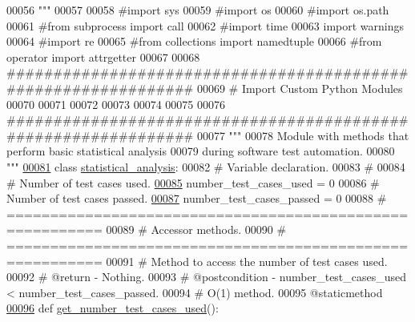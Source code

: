 \begin{DoxyCode}
00056 \textcolor{stringliteral}{"""}
00057 
00058 \textcolor{comment}{#import sys}
00059 \textcolor{comment}{#import os}
00060 \textcolor{comment}{#import os.path}
00061 \textcolor{comment}{#from subprocess import call}
00062 \textcolor{comment}{#import time}
00063 \textcolor{keyword}{import} warnings
00064 \textcolor{comment}{#import re}
00065 \textcolor{comment}{#from collections import namedtuple}
00066 \textcolor{comment}{#from operator import attrgetter}
00067 
00068 \textcolor{comment}{###############################################################}
00069 \textcolor{comment}{#   Import Custom Python Modules}
00070 
00071 
00072 
00073 
00074 
00075 
00076 \textcolor{comment}{###############################################################}
00077 \textcolor{stringliteral}{"""}
00078 \textcolor{stringliteral}{    Module with methods that perform basic statistical analysis}
00079 \textcolor{stringliteral}{        during software test automation.}
00080 \textcolor{stringliteral}{"""}
\hypertarget{test__statistics_8py_source_l00081}{}\hyperlink{classstatistics_1_1test__statistics_1_1statistical__analysis}{00081} \textcolor{keyword}{class }\hyperlink{classstatistics_1_1test__statistics_1_1statistical__analysis}{statistical\_analysis}:
00082     \textcolor{comment}{#   Variable declaration.}
00083     \textcolor{comment}{#}
00084     \textcolor{comment}{#   Number of test cases used.}
\hypertarget{test__statistics_8py_source_l00085}{}\hyperlink{classstatistics_1_1test__statistics_1_1statistical__analysis_afed7a27a010e7377d2719b315d5d5f17}{00085}     number\_test\_cases\_used = 0
00086     \textcolor{comment}{#   Number of test cases passed.}
\hypertarget{test__statistics_8py_source_l00087}{}\hyperlink{classstatistics_1_1test__statistics_1_1statistical__analysis_ac7555db570919cec38a8325d8427093e}{00087}     number\_test\_cases\_passed = 0
00088     \textcolor{comment}{# =========================================================}
00089     \textcolor{comment}{#   Accessor methods.}
00090     \textcolor{comment}{# =========================================================}
00091     \textcolor{comment}{#   Method to access the number of test cases used.}
00092     \textcolor{comment}{#   @return - Nothing.}
00093     \textcolor{comment}{#   @postcondition - number\_test\_cases\_used < number\_test\_cases\_passed.}
00094     \textcolor{comment}{#   O(1) method.}
00095     @staticmethod
\hypertarget{test__statistics_8py_source_l00096}{}\hyperlink{classstatistics_1_1test__statistics_1_1statistical__analysis_a8bddd92400d64e68caf934defa5ededb}{00096}     \textcolor{keyword}{def }\hyperlink{classstatistics_1_1test__statistics_1_1statistical__analysis_a8bddd92400d64e68caf934defa5ededb}{get\_number\_test\_cases\_used}():

\end{DoxyCode}
